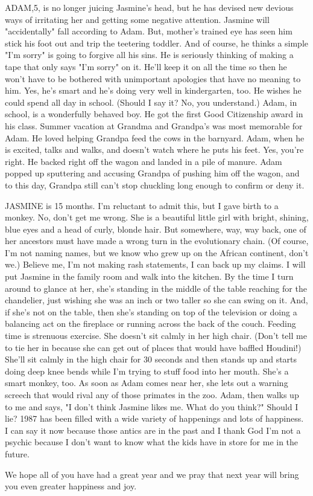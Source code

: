 ADAM,5, is no longer juicing Jasmine's head, but he has devised new devious ways of irritating her and getting some negative attention. Jasmine
will "accidentally" fall according to Adam. But, mother's trained eye has seen him stick his foot out and trip the teetering toddler. And of
course, he thinks a simple "I'm sorry" is going to forgive all his sins. He is seriously thinking of making a tape that only says "I'm sorry" on
it. He'll keep it on all the time so then he won't have to be bothered with unimportant apologies that have no meaning to him. Yes, he's smart
and he's doing very well in kindergarten, too. He wishes he could spend all day in school. (Should I say it? No, you understand.) Adam, in
school, is a wonderfully behaved boy. He got the first Good Citizenship award in his class. Summer vacation at Grandma and Grandpa's was most
memorable for Adam. He loved helping Grandpa feed the cows in the barnyard. Adam, when he is excited, talks and walks, and doesn't watch where
he puts his feet. Yes, you're right. He backed right off the wagon and landed in a pile of manure. Adam popped up sputtering and accusing
Grandpa of pushing him off the wagon, and to this day, Grandpa still can't stop chuckling long enough to confirm or deny it.

JASMINE is 15 months. I'm reluctant to admit this, but I gave birth to a monkey. No, don't get me wrong. She is a beautiful little girl with
bright, shining, blue eyes and a head of curly, blonde hair. But somewhere, way, way back, one of her ancestors must have made a wrong turn in
the evolutionary chain. (Of course, I'm not naming names, but we know who grew up on the African continent, don't we.) Believe me, I'm not
making rash statements, I can back up my claims. I will put Jasmine in the family room and walk into the kitchen. By the time I turn around to
glance at her, she's standing in the middle of the table reaching for the chandelier, just wishing she was an inch or two taller so she can
swing on it. And, if she's not on the table, then she's standing on top of the television or doing a balancing act on the fireplace or running
across the back of the couch. Feeding time is strenuous exercise. She doesn't sit calmly in her high chair. (Don't tell me to tie her in because
she can get out of places that would have baffled Houdini!) She'll sit calmly in the high chair for 30 seconds and then stands up and starts
doing deep knee bends while I'm trying to stuff food into her mouth. She's a smart monkey, too. As soon as Adam comes near her, she lets out a
warning screech that would rival any of those primates in the zoo. Adam, then walks up to me and says, "I don't think Jasmine likes me. What do
you think?" Should I lie? 1987 has been filled with a wide variety of happenings and lots of happiness. I can say it now because those antics
are in the past and I thank God I'm not a psychic because I don't want to know what the kids have in store for me in the future.

We hope all of you have had a great year and we pray that next year will bring you even greater happiness and joy.



%
